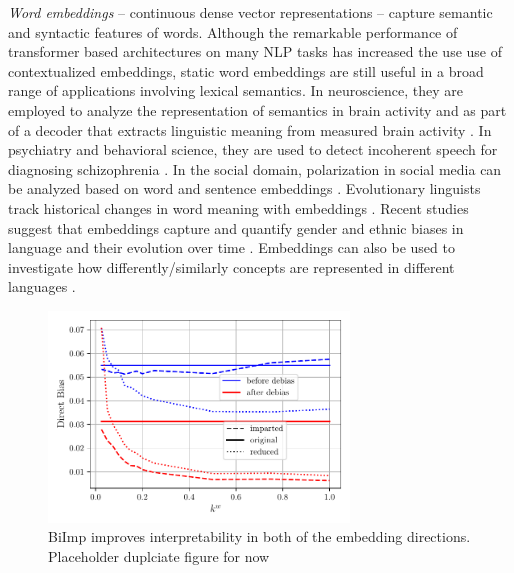 \documentclass[11pt,a4paper]{article}
\def\proposedmethod{BiImp}
\begin{document}
\emph{Word embeddings} \citep{mikolov13word2vec_a,mikolov13word2vec_b,pennington14glove,bojanowski2017enriching}
-- continuous dense vector representations --
capture semantic and syntactic features
of words. 
Although the remarkable performance of transformer based
architectures
\citep{vaswani17transformers,devlin19BERT,Radford19GPT2} on
many NLP tasks has increased the use use of contextualized embeddings, static word embeddings are still useful in a broad range of applications involving lexical semantics. 
In neuroscience, they are employed to analyze the representation of semantics in brain
activity
\citep{ruan16brainActivity,huth16semanticMaps,zhang20connecting} and as part of a
decoder that extracts linguistic meaning from measured brain
activity \citep{pereira18universalDecoder}. 
In psychiatry and behavioral science, they are used to detect incoherent speech for diagnosing schizophrenia
\citep{iter2018automatic}.
In the social domain, polarization in social media \citep{demszky19analyzing} can be analyzed based on word and sentence embeddings \citep{demszky19analyzing}. 
Evolutionary linguists track historical changes in word meaning with embeddings \citep{hamilton16diachronic,kutuzov18diachronic}. 
Recent studies suggest that embeddings  capture and quantify gender and ethnic biases in language \citep{bolukbasi16debiasing,garg18gender100years,caliskan17humanLikeBiases} and their evolution over time \citep{agarwal2019word}. 
Embeddings can also be used to investigate how differently/similarly concepts are represented in different languages
\citep{senel17crossLingual,senel18atlas}.

\begin{figure}
    \centering
    \includegraphics[width=8.0cm]{Figures/gender_bias_reduction.pdf}
    \caption{\proposedmethod{} improves interpretability in both of the embedding directions. Placeholder duplciate figure for now}
    \label{fig:bi_imp}
\end{figure}
\end{document}
